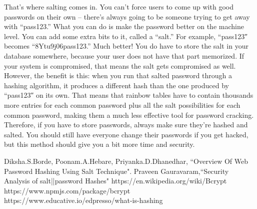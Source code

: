 \documentclass{article}[12pt,a4paper]
\begin{document}
That’s where salting comes in. You can’t force users to come up with good passwords on their own – there’s always going to be someone trying to get away with “pass123.” What you can do is make the password better on the machine level. You can add some extra bits to it, called a “salt.” For example, “pass123″ becomes “8Ytu9j06pass123.” Much better! You do have to store the salt in your database somewhere, because your user does not have that part memorized. If your system is compromised, that means the salt gets compromised as well. However, the benefit is this: when you run that salted password through a hashing algorithm, it produces a different hash than the one produced by “pass123″ on its own. That means that rainbow tables have to contain thousands more entries for each common password plus all the salt possibilities for each common password, making them a much less effective tool for password cracking.
Therefore, if you have to store passwords, always make sure they’re hashed and salted. You should still have everyone change their passwords if you get hacked, but this method should give you a bit more time and security.
\begin{thebibliography}{1}
    
 Diksha.S.Borde, Poonam.A.Hebare, Priyanka.D.Dhanedhar, ``Overview Of Web Password Hashing Using Salt Technique". 
 Praveen Gauravaram,``Security Analysis of salt||password Hashes"
 https://en.wikipedia.org/wiki/Bcrypt
 https://www.npmjs.com/package/bcrypt
 https://www.educative.io/edpresso/what-is-hashing
\end{thebibliography}
\end{document}
